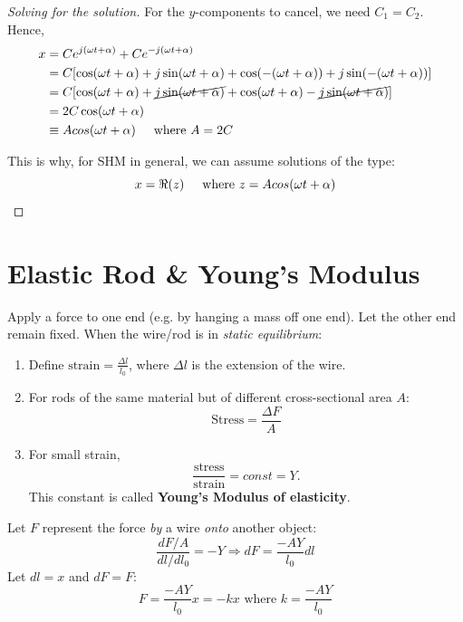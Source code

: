 \documentclass[11pt,letterpaper,titlepage,oneside]{book}
\newcommand{\htab}{\hspace{0.5cm}}
\newcommand{\where}{\htab\text{where }}
\begin{document}
\begin{proof}[Solving for the solution]
For the $y$-components to cancel, we need $C_1=C_2$. Hence,
\begin{align*}
x
&=Ce^{j(\omega t +\alpha)} + Ce^{-j(\omega t +\alpha)} \\
&=C[\cos(\omega t + \alpha) + j\sin(\omega t + \alpha) + \cos(-(\omega t + \alpha)) + j\sin(-(\omega t + \alpha))] \\
&=C[\cos(\omega t + \alpha) + \cancel{j\sin(\omega t + \alpha)} + \cos(\omega t + \alpha) - \cancel{j\sin(\omega t + \alpha)}] \\
&= 2C\cos(\omega t + \alpha) \\
&\equiv Acos(\omega t + \alpha) \where A=2C
\end{align*}

This is why, for SHM in general, we can assume solutions of the type:
\begin{equation}
	x=\Re(z) \where z=Acos(\omega t + \alpha)
\end{equation}
\end{proof}


\section{Elastic Rod \& Young's Modulus}

Apply a force to one end (e.g. by hanging a mass off one end). Let the other end remain fixed. When the wire/rod is in \textit{static equilibrium}:
\begin{enumerate}
\item Define $\boxed{\text{strain} = \frac{\Delta l}{l_0}}$, where $\Delta l$ is the extension of the wire. 

\item For rods of the same material but of different cross-sectional area $A$: \\
\[\boxed{ \text{Stress} = \frac{\Delta F}{A}} \]

\item For small strain, \[\boxed{ \frac{\text{stress}}{\text{strain}}=const=Y }.\]
This constant is called \textbf{Young's Modulus of elasticity}.
\end{enumerate}

Let $F$ represent the force \textit{by} a wire \textit{onto} another object:
\begin{equation} \frac{dF/A}{dl/dl_0} = -Y \Longrightarrow dF = \frac{-AY}{l_0}dl \label{youngs_dF} \end{equation}
Let $dl = x$ and $dF=F$: \begin{equation} \boxed{F=\frac{-AY}{l_0}x=-kx} \text{ where } k=\frac{-AY}{l_0} \label{youngs_F} \end{equation}
\end{document}
